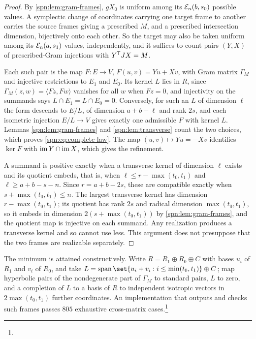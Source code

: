 \begin{proof}
By \cref{spn:lem:gram-frames}, $gX_0$ is uniform among its
$\mathcal{E}_n(b,s_0)$ possible values. A symplectic change of coordinates
carrying one target frame to another carries the source frames giving a
prescribed $M$, and a prescribed intersection dimension, bijectively onto each
other. So the target may also be taken uniform among its $\mathcal{E}_n(a,s_1)$
values, independently, and it suffices to count pairs $(Y,X)$ of
prescribed-Gram injections with $Y^{\mathsf{T}}JX=M$.

Each such pair is the map $F\colon E\to V$, $F(u,v)=Yu+Xv$, with Gram matrix
$\Gamma_M$ and injective restrictions to $E_1$ and $E_0$. Its kernel $L$ lies
in $R$, since $\Gamma_M(z,w)=\langle Fz,Fw\rangle$ vanishes for all $w$ when
$Fz=0$, and injectivity on the summands says $L\cap E_1=L\cap E_0=0$.
Conversely, for such an $L$ of dimension $\ell$ the form descends to $E/L$,
of dimension $a+b-\ell$ and rank $2s$, and each isometric injection
$E/L\to V$ gives exactly one admissible $F$ with kernel $L$. Lemmas
\ref{spn:lem:gram-frames} and \ref{spn:lem:transverse} count the two choices,
which proves \eqref{spn:eq:complete-law}. The map $(u,v)\mapsto Yu=-Xv$
identifies $\ker F$ with $\operatorname{im} Y\cap\operatorname{im} X$, which gives the refinement.

A summand is positive exactly when a transverse kernel of dimension $\ell$
exists and its quotient embeds, that is, when $\ell\le r-\max(t_0,t_1)$ and
$\ell\ge a+b-s-n$. Since $r=a+b-2s$, these are compatible exactly when
$s+\max(t_0,t_1)\le n$. The largest transverse kernel has dimension
$r-\max(t_0,t_1)$; its quotient has rank $2s$ and radical dimension
$\max(t_0,t_1)$, so it embeds in dimension $2(s+\max(t_0,t_1))$ by
\cref{spn:lem:gram-frames}, and the quotient map is injective on each summand.
Any realization produces a transverse kernel and so cannot use less. This
argument does not presuppose that the two frames are realizable separately.
\end{proof}

The minimum is attained constructively. Write $R=R_1\oplus R_0\oplus C$ with
bases $u_i$ of $R_1$ and $v_i$ of $R_0$, and take
$L=\operatorname{span}\set{u_i+v_i:i\le\min(t_0,t_1)}\oplus C$; map hyperbolic
pairs of the nondegenerate part of $\Gamma_M$ to standard pairs, $L$ to zero,
and a completion of $L$ to a basis of $R$ to independent isotropic vectors in
$2\max(t_0,t_1)$ further coordinates. An implementation that outputs and
checks such frames passes $805$ exhaustive cross-matrix
cases.\footnote{}

